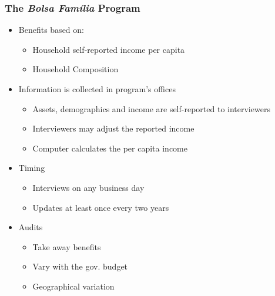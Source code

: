 \documentclass[xcolor=pdftex,dvipsnames,table]{beamer}
\begin{document}
\begin{frame}
	\frametitle{The \textit{Bolsa Fam\'ilia} Program}
	\pause
\begin{itemize}
\item Benefits based on: 
\begin{itemize}
\item Household self-reported income per capita
\item Household Composition
\end{itemize}
\pause
\item Information is collected in program's offices
\begin{itemize}
\item Assets, demographics and income are self-reported to interviewers
\item Interviewers may adjust the reported income
\item Computer calculates the per capita income
\end{itemize}
\pause
\item Timing
\begin{itemize}
\item Interviews on any business day
\item Updates at least once every two years
\end{itemize}
\pause
\item Audits
\begin{itemize}
\item Take away benefits
\item Vary with the gov. budget
\item Geographical variation
\end{itemize}
\end{itemize}	
\end{frame}
\end{document}
